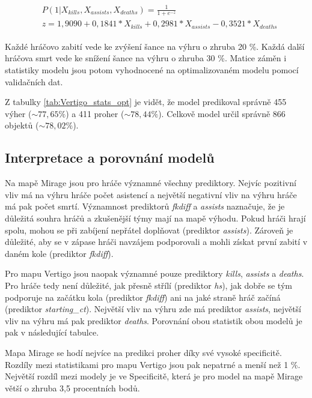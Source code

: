 \begin{align}
    \begin{split}
        &P(1 | X_{kills}, X_{assists}, X_{deaths}) = \frac{1}{1 + e^{-z}} \\
        &z = 1,9090 + 0,1841*X_{kills} + 0,2981*X_{assists} - 0,3521*X_{deaths}
    \end{split}
\end{align}

Každé hráčovo zabití vede ke zvýšení šance na výhru o zhruba 20 \%. Každá další hráčova smrt vede ke snížení šance na výhru o zhruba 30 \%. 
Matice záměn i statistiky modelu jsou potom vyhodnocené na optimalizovaném modelu pomocí validačních dat.





Z tabulky \ref{tab:Vertigo_stats_opt} je vidět, že model predikoval správně 455 výher ($\sim 77,65 \%$) a 411 proher ($\sim 78,44 \%$).
Celkově model určil správně 866 objektů ($\sim 78,02 \%$).

\subsection{Interpretace a porovnání modelů}
Na mapě Mirage jsou pro hráče významné všechny prediktory. Nejvíc pozitivní vliv má na výhru hráče počet asistencí a největší negativní vliv
na výhru hráče má pak počet smrtí. Významnost prediktorů \textit{fkdiff} a \textit{assists} naznačuje, že je důležitá souhra hráčů a zkušenější týmy
mají na mapě výhodu. Pokud hráči hrají spolu, mohou se při zabíjení nepřátel doplňovat (prediktor \textit{assists}). Zároveň je důležité, aby se v zápase
hráči navzájem podporovali a mohli získat první zabití v daném kole (prediktor \textit{fkdiff}).

Pro mapu Vertigo jsou naopak významné pouze prediktory \textit{kills}, \textit{assists} a \textit{deaths}. Pro hráče tedy není důležité, jak přesně
střílí (prediktor \textit{hs}), jak dobře se tým podporuje na začátku kola (prediktor \textit{fkdiff}) ani na jaké straně hráč začíná (prediktor \textit{starting\_ct}).
Největší vliv na výhru zde má prediktor \textit{assists}, největší vliv na výhru má pak prediktor \textit{deaths}. Porovnání obou statistik obou modelů je pak
v následující tabulce.



Mapa Mirage se hodí nejvíce na predikci proher díky své vysoké specificitě. Rozdíly mezi statistikami pro mapu Vertigo jsou pak nepatrné a menší než 1 \%.
Největší rozdíl mezi modely je ve Specificitě, která je pro model na mapě Mirage větší o zhruba 3,5 procentních bodů.


